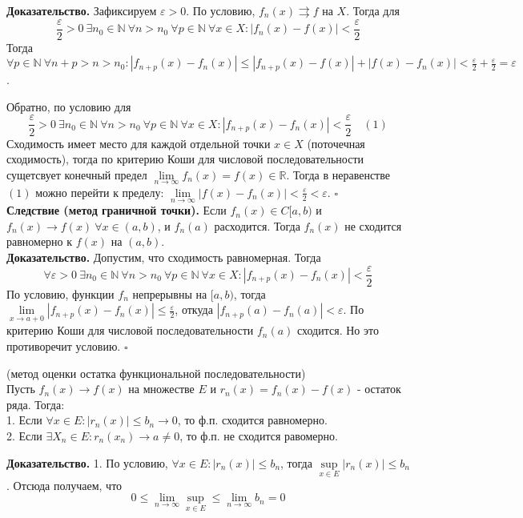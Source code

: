 \textbf{Доказательство.} Зафиксируем $\varepsilon>0$. По условию,
$f_n(x)\rightrightarrows f$ на $X$. Тогда для  
$$\frac{\varepsilon}{2}>0~\exists n_0\in\mathbb{N}~\forall n>n_0~\forall p\in
\mathbb{N}~\forall x\in X:|f_{n}(x)-f(x)|<\frac{\varepsilon}{2}$$
Тогда $\forall p\in \mathbb{N}~\forall n+p>n>n_0:|f_{n+p}(x)-f_{n}(x)|
\leqslant |f_{n+p}(x)-f(x)|+|f(x)-f_{n}(x)|<\frac{\varepsilon}{2}
+\frac{\varepsilon}{2}=\varepsilon$.

Обратно, по условию для
$$\frac{\varepsilon}{2}>0~\exists n_0\in\mathbb{N}~\forall n>n_0~\forall p\in
\mathbb{N}~\forall x\in X:|f_{n+p}(x)-f_{n}(x)|<\frac{\varepsilon}{2}
\quad(1)$$
Сходимость имеет место для каждой отдельной точки $x\in X$ (поточечная 
сходимость), тогда по критерию Коши для числовой последовательности 
сущетсвует конечный предел  $\lim\limits_{n \to \infty} f_n(x)=f(x)\in
\mathbb{R}$. Тогда в неравенстве $(1)$ можно перейти к пределу:
 $\lim\limits_{n \to \infty} |f(x)-f_n(x)|<\frac{\varepsilon}{2}<
 \varepsilon$. $\square$\\
\textbf{Следствие (метод граничной точки).} Если $f_n(x)\in C[a,b)$ и 
$f_n(x)\to f(x)~\forall x\in(a,b)$, и $f_n(a)$ расходится. Тогда  $f_n(x)$
не сходится равномерно к  $f(x)$ на  $(a,b)$.\\
\textbf{Доказательство.} Допустим, что сходимость равномерная. Тогда 
$$\forall \varepsilon>0~\exists n_0\in\mathbb{N}~\forall n>n_0~\forall p\in
\mathbb{N}~\forall x\in X:|f_{n+p}(x)-f_{n}(x)|<\frac{\varepsilon}{2}$$
По условию, функции $f_n$ непрерывны на $[a,b)$, тогда 
$\lim\limits_{x \to a+0}|f_{n+p}(x)-f_n(x)|\leqslant \frac{\varepsilon}{2}$,
откуда $|f_{n+p}(a)-f_n(a)|<\varepsilon$. По критерию Коши для числовой
последовательности $f_n(a)$ сходится. Но это противоречит условию. 
$\square$
\begin{theor}
    (метод оценки остатка функциональной последовательности)\\
    Пусть $f_n(x)\to f(x)$ на множестве  $E$ и $r_n(x)=f_n(x)-f(x)$ - 
    остаток ряда. Тогда:\\
    1. Если  $\forall x\in E:|r_n(x)|\leqslant b_n\to 0$, то
    ф.п. сходится равномерно.\\
    2. Если $\exists X_n\in E:r_n(x_n)\to a\ne 0$, то ф.п. не сходится
    равомерно. 
\end{theor}
\textbf{Доказательство.} 
1. По условию, $\forall x\in E:|r_n(x)|\leqslant b_n$, тогда
$\sup\limits_{x\in E}|r_n(x)|\leqslant b_n$. Отсюда получаем, что
$$0\leqslant \lim\limits_{n \to \infty} \sup\limits_{x\in E}\leqslant 
\lim\limits_{n \to \infty} b_n=0$$
